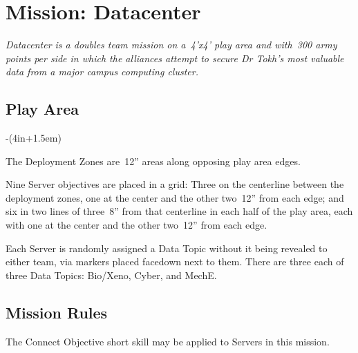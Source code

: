 \chapter{Mission: Datacenter}

\emph{\emph{Datacenter} is a doubles team mission on a~4'x4' play area
  and with~300 army points per side in which the alliances attempt to
  secure Dr Tokh's most valuable data from a major campus computing
  cluster.}

\section{Play Area}
\vspace{-2\parskip}
\noindent\begin{stdminipage}{\linewidth-(4in+1.5em)}
\vspace{0pt}   

The Deployment Zones are~12'' areas along opposing play area edges.

Nine Server objectives are placed in a grid: Three on the centerline
between the deployment zones, one at the center and the other two~12''
from each edge; and six in two lines of three~8'' from that centerline
in each half of the play area, each with one at the center and the
other two~12'' from each edge.

Each Server is randomly assigned a Data Topic without it being
revealed to either team, via markers placed facedown next to them.
There are three each of three Data Topics: Bio/Xeno, Cyber, and MechE.

\section{Mission Rules}



The Connect Objective short skill may be applied to Servers in this
mission.

\end{stdminipage}
\hfill
